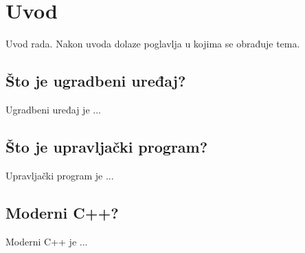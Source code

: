 \chapter{Uvod}
Uvod rada. Nakon uvoda dolaze poglavlja u kojima se obrađuje tema.

\section{Što je ugradbeni uređaj?}
Ugradbeni uređaj je ...

\section{Što je upravljački program?}
Upravljački program je ...

\section{Moderni C++?}
Moderni C++ je ...
